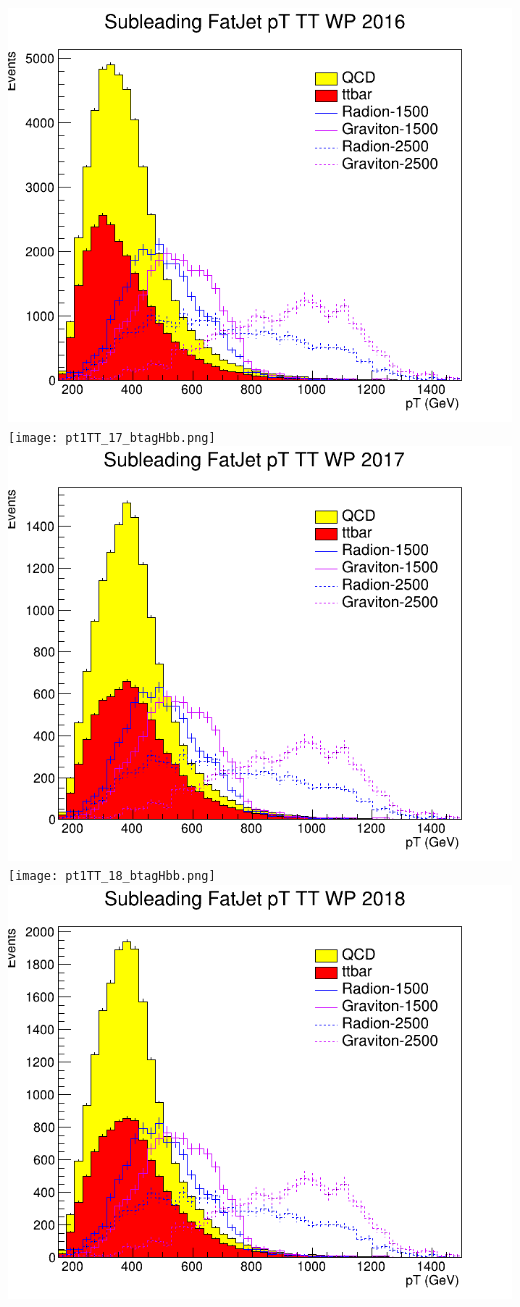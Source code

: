 \includegraphics[width=1\textwidth]{pt1TT_16_deepTagMD_HbbvsQCD.png}
\texttt{[image: pt1TT\_17\_btagHbb.png]}
\includegraphics[width=1\textwidth]{pt1TT_17_deepTagMD_HbbvsQCD.png}
\texttt{[image: pt1TT\_18\_btagHbb.png]}
\includegraphics[width=1\textwidth]{pt1TT_18_deepTagMD_HbbvsQCD.png}
